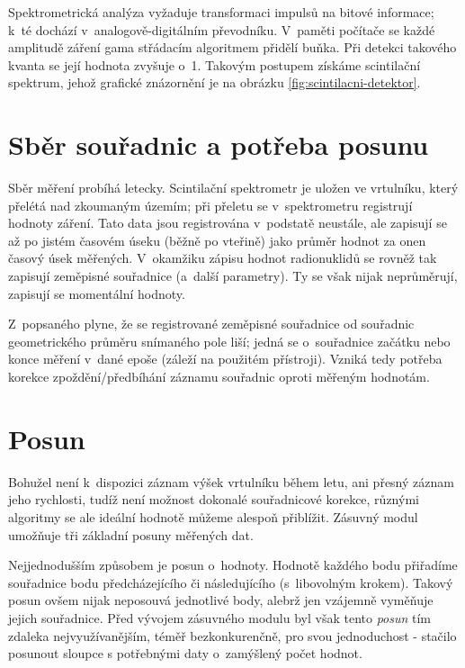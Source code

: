 Spektrometrická analýza vyžaduje transformaci impulsů na bitové informace; k~té dochází
v~analogově-digitálním převodníku. V~paměti počítače se každé amplitudě záření gama
střádacím algoritmem přidělí buňka. Při detekci takového kvanta se její hodnota zvyšuje o~1.
Takovým postupem získáme scintilační spektrum, jehož grafické
znázornění je na obrázku \ref{fig:scintilacni-detektor}. 

\section{Sběr souřadnic a potřeba posunu}
\label{potreba posunu}

Sběr měření probíhá letecky. Scintilační spektrometr je uložen ve vrtulníku, který přelétá nad zkoumaným
územím; při přeletu se v~spektrometru registrují hodnoty záření. Tato data jsou registrována v~podstatě
neustále, ale zapisují se až po jistém časovém úseku (běžně po vteřině) jako průměr hodnot za onen
časový úsek měřených. V~okamžiku zápisu hodnot radionuklidů se rovněž tak zapisují zeměpisné souřadnice
(a~další parametry). Ty se však nijak neprůměrují, zapisují se momentální hodnoty. 

Z~popsaného plyne, že se registrované zeměpisné souřadnice od souřadnic geometrického průměru snímaného
pole liší; jedná se o~souřadnice začátku nebo konce měření v~dané epoše (záleží na použitém přístroji).
Vzniká tedy potřeba korekce zpoždění/předbíhání záznamu souřadnic oproti měřeným hodnotám. 

\section{Posun}
\label{posun}

Bohužel není k~dispozici záznam výšek vrtulníku během letu, ani přesný záznam jeho rychlosti, tudíž
není možnost dokonalé souřadnicové korekce, různými algoritmy se ale ideální hodnotě můžeme alespoň
přiblížit. Zásuvný modul umožňuje tři základní posuny měřených dat. 

Nejjednodušším způsobem je posun o~hodnoty. Hodnotě každého bodu přiřadíme souřadnice bodu
předcházejícího či následujícího (s~libovolným krokem). Takový posun ovšem nijak neposouvá jednotlivé
body, alebrž jen vzájemně vyměňuje jejich souřadnice. Před vývojem zásuvného modulu byl však tento
\textit{posun} tím zdaleka nejvyužívanějším, téměř bezkonkurenčně, pro svou jednoduchost - stačilo
posunout sloupce s potřebnými daty o~zamýšlený počet hodnot. 

